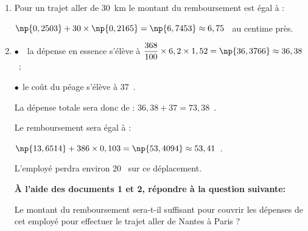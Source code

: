 \documentclass[10pt]{article}
\newcommand{\euro}{\eurologo{}}
\begin{document}
\begin{enumerate}
\item %
Pour un \og trajet aller\fg{} de 30~km le montant du remboursement est égal à :

$\np{0,2503} + 30 \times \np{0,2165} = \np{6,7453} \approx 6,75$~\euro{} au centime près.
\item  %

$\bullet$~~la dépense en essence s'élève à $\dfrac{368}{100} \times 6,2 \times 1,52 = \np{36,3766} \approx 36,38$~\euro ;

$\bullet~~$le coût du péage s'élève à 37~\euro.

La dépense totale sera donc de : $36,38 + 37 = 73,38$~\euro.

Le remboursement sera égal à :

$\np{13,6514} + 386 \times 0,103 = \np{53,4094} \approx 53,41$~\euro. 

L'employé perdra environ 20~\euro{} sur ce déplacement.

\textbf{À l'aide des documents 1 et 2, répondre à la question suivante:}

\og Le montant du remboursement sera-t-il suffisant pour couvrir les dépenses de cet
employé pour effectuer le \og trajet aller\fg{} de Nantes à Paris ? \fg
\end{enumerate}

\vspace{0,5cm}
\end{document}
